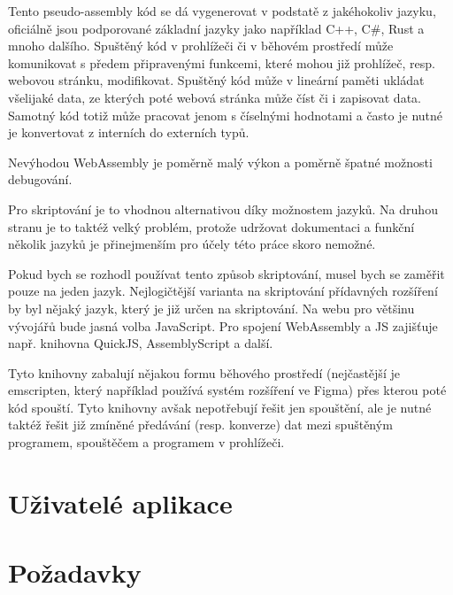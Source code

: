 Tento pseudo-assembly kód se dá vygenerovat v podstatě z jakéhokoliv jazyku, oficiálně jsou podporované základní jazyky jako například C++, C\#, Rust a mnoho dalšího.
Spuštěný kód v prohlížeči či v běhovém prostředí může komunikovat s předem připravenými funkcemi, které mohou již prohlížeč, resp. webovou stránku, modifikovat.
Spuštěný kód může v lineární paměti ukládat všelijaké data, ze kterých poté webová stránka může číst či i zapisovat data.
Samotný kód totiž může pracovat jenom s číselnými hodnotami a často je nutné je konvertovat z interních do externích typů.

Nevýhodou WebAssembly je poměrně malý výkon a poměrně špatné možnosti debugování.

Pro skriptování je to vhodnou alternativou díky možnostem jazyků. 
Na druhou stranu je to taktéž velký problém, protože udržovat dokumentaci a funkční několik jazyků je přinejmenším pro účely této práce skoro nemožné.

Pokud bych se rozhodl používat tento způsob skriptování, musel bych se zaměřit pouze na jeden jazyk.
Nejlogičtější varianta na skriptování přídavných rozšíření by byl nějaký jazyk, který je již určen na skriptování.
Na webu pro většinu vývojářů bude jasná volba JavaScript.
Pro spojení WebAssembly a JS zajišťuje např. knihovna QuickJS, AssemblyScript a další.

Tyto knihovny zabalují nějakou formu běhového prostředí (nejčastější je emscripten, který například používá systém rozšíření ve Figma) přes kterou poté kód spouští.
Tyto knihovny avšak nepotřebují řešit jen spouštění, ale je nutné taktéž řešit již zmíněné předávání (resp. konverze) dat mezi spuštěným programem, spouštěčem a programem v prohlížeči.

\section{Uživatelé aplikace}

\section{Požadavky}